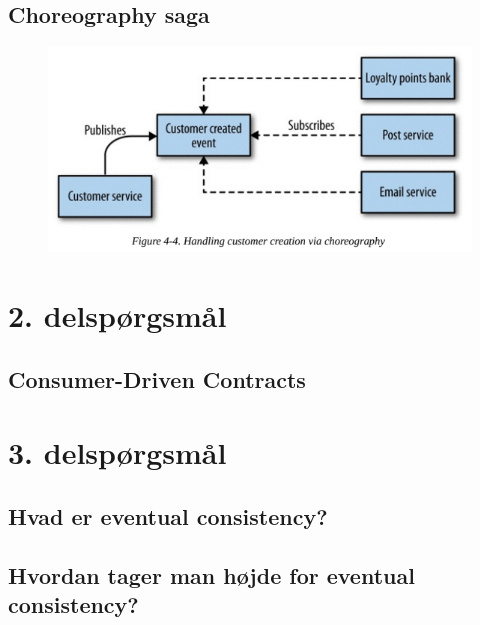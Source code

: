 \documentclass[12pt]{article} %
\begin{document}
\subsection { Choreography saga }
\begin{figure}[h]
\includegraphics[width=1\textwidth]{cheographysaga}
  \caption{\cite[p.~92]{newman2015building}}

\end{figure}
\section { 2. delspørgsmål }
\subsection { Consumer-Driven Contracts }
\section { 3. delspørgsmål }
\subsection { Hvad er eventual consistency? }
\subsection { Hvordan tager man højde for eventual consistency? }


\newpage


\end{document}
